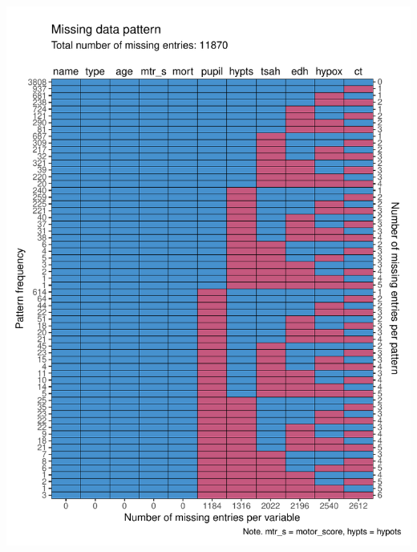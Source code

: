 \documentclass[
]{jss}
\begin{document}
\begin{CodeChunk}


\begin{center}\includegraphics{Imputation_of_Incomplete_Multilevel_Data_files/figure-latex/impact-1} \end{center}

\end{CodeChunk}
\end{document}
